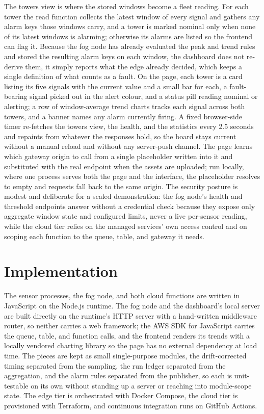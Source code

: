 \documentclass[conference]{IEEEtran}
\begin{document}
The towers view is where the stored windows become a fleet reading. For each tower the read function collects the latest window of every signal and gathers any alarm keys those windows carry, and a tower is marked nominal only when none of its latest windows is alarming; otherwise its alarms are listed so the frontend can flag it. Because the fog node has already evaluated the peak and trend rules and stored the resulting alarm keys on each window, the dashboard does not re-derive them, it simply reports what the edge already decided, which keeps a single definition of what counts as a fault. On the page, each tower is a card listing its five signals with the current value and a small bar for each, a fault-bearing signal picked out in the alert colour, and a status pill reading nominal or alerting; a row of window-average trend charts tracks each signal across both towers, and a banner names any alarm currently firing. A fixed browser-side timer re-fetches the towers view, the health, and the statistics every 2.5 seconds and repaints from whatever the responses hold, so the board stays current without a manual reload and without any server-push channel. The page learns which gateway origin to call from a single placeholder written into it and substituted with the real endpoint when the assets are uploaded; run locally, where one process serves both the page and the interface, the placeholder resolves to empty and requests fall back to the same origin. The security posture is modest and deliberate for a scaled demonstration: the fog node's health and threshold endpoints answer without a credential check because they expose only aggregate window state and configured limits, never a live per-sensor reading, while the cloud tier relies on the managed services' own access control and on scoping each function to the queue, table, and gateway it needs.

\section{Implementation}

The sensor processes, the fog node, and both cloud functions are written in JavaScript on the Node.js runtime. The fog node and the dashboard's local server are built directly on the runtime's HTTP server with a hand-written middleware router, so neither carries a web framework; the AWS SDK for JavaScript carries the queue, table, and function calls, and the frontend renders its trends with a locally vendored charting library so the page has no external dependency at load time. The pieces are kept as small single-purpose modules, the drift-corrected timing separated from the sampling, the run ledger separated from the aggregation, and the alarm rules separated from the publisher, so each is unit-testable on its own without standing up a server or reaching into module-scope state. The edge tier is orchestrated with Docker Compose, the cloud tier is provisioned with Terraform, and continuous integration runs on GitHub Actions.
\end{document}
